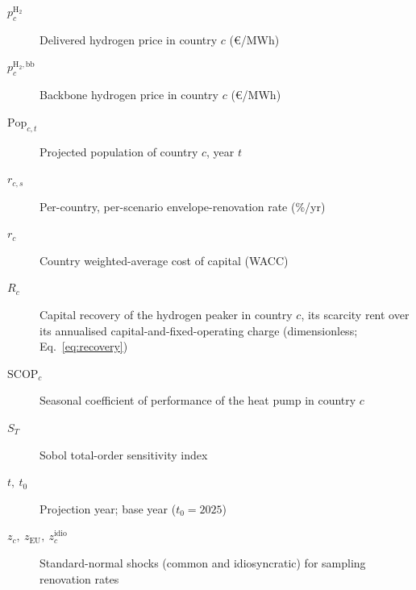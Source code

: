 \begin{description}
 \item[$p^{\mathrm{H_2}}_{c}$] Delivered hydrogen price in country $c$ (\euro{}/MWh)
 \item[$p^{\mathrm{H_2,bb}}_{c}$] Backbone hydrogen price in country $c$ (\euro{}/MWh)
 \item[$\mathrm{Pop}_{c,t}$] Projected population of country $c$, year $t$
 \item[$r_{c,s}$] Per-country, per-scenario envelope-renovation rate (\%/yr)
 \item[$r_{c}$] Country weighted-average cost of capital (WACC)
 \item[$R_{c}$] Capital recovery of the hydrogen peaker in country $c$, its scarcity rent
over its annualised capital-and-fixed-operating charge (dimensionless;
Eq.~\eqref{eq:recovery})
 \item[$\mathrm{SCOP}_{c}$] Seasonal coefficient of performance of the heat pump in country $c$
 \item[$S_{T}$] Sobol total-order sensitivity index
 \item[$t,\ t_{0}$] Projection year; base year ($t_{0}=2025$)
 \item[$z_{c},\ z_{\mathrm{EU}},\ z_{c}^{\mathrm{idio}}$] Standard-normal shocks (common and idiosyncratic) for sampling renovation rates
\end{description}

